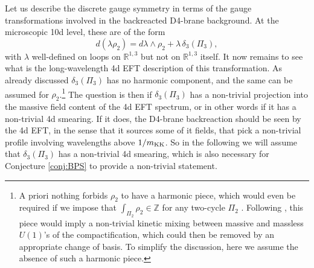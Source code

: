 \documentclass[11pt]{article}
\def\be{\begin{equation}}
\def\ee{\end{equation}}
\newcommand{\IR}{\mathbb{R}}
\newcommand{\IZ}{\mathbb{Z}}
\begin{document}
Let us describe the discrete gauge symmetry in terms of the gauge transformations involved in the backreacted D4-brane background. At the microscopic 10d level, these are of the form
\be
d \left( \lambda \rho_{2}\right) = d\lambda \wedge  \rho_{2} + \lambda \, \delta_3 (\Pi_{3}) ,
\label{truel}
\ee
with $\lambda$ well-defined on loops on $\IR^{1,3}$ but not on $\IR^{1,3}$ itself. It now remains to see what is the long-wavelength 4d EFT description of this transformation. As already discussed $\delta_3 (\Pi_{3})$ has no harmonic component, and the same can be assumed for $\rho_2$.\footnote{A priori nothing forbids $\rho_2$ to have a  harmonic piece, which would even be required if we impose that $\int_{\Pi_2} \rho_2 \in \IZ$ for any two-cycle $\Pi_2$ \cite{Marchesano:2014iea}. Following \cite{Marchesano:2014bia}, this piece would imply a non-trivial kinetic mixing between massive and massless $U(1)$'s of the compactification, which could then be removed by an  appropriate change of basis. To simplify the discussion, here we assume the absence of such a harmonic piece.} The question is then if $\delta_3 (\Pi_{3})$ has a non-trivial projection into the massive field content of the 4d EFT spectrum, or in other words if it has a non-trivial 4d smearing. If it does, the D4-brane backreaction should be seen by the 4d EFT, in the sense that it sources some of it fields, that pick a non-trivial profile involving wavelengths above $1/m_{\rm KK}$. So in the following we will assume that $\delta_3 (\Pi_{3})$ has a non-trivial 4d smearing, which is also necessary for Conjecture \ref{conj:BPS} to provide a non-trivial statement.
\end{document}
